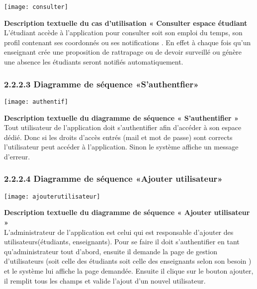 \documentclass[a4paper,12pt,oneside]{report}
\begin{document}
\begin{center}
\texttt{[image: consulter]}
\label{fig1}
\end{center}
\textbf{Description textuelle du cas d'utilisation « Consulter espace étudiant } \\
L'étudiant accède à l'application pour consulter soit son emploi du temps, son profil contenant ses coordonnés ou ses notifications . En effet à chaque fois qu'un enseignant crée une proposition de rattrapage ou de devoir surveillé ou génère une absence les étudiants seront notifiés  automatiquement.
\subsubsection{ 2.2.2.3 Diagramme de séquence «S’authentfier»}
\begin{center}
\texttt{[image: authentif]}
\label{fig1}
\end{center}
\textbf{Description textuelle du diagramme de séquence « S’authentifier »}\\
Tout utilisateur de l'application doit s'authentifier afin d'accéder à son espace dédié. Donc si les droits d'accès entrés (mail et mot de passe) sont corrects l'utilisateur peut accéder à l'application. Sinon le système affiche un message d'erreur. 
\subsubsection{ 2.2.2.4 Diagramme de séquence «Ajouter utilisateur»}
\begin{center}
\texttt{[image: ajouterutilisateur]}
\label{fig1}
\end{center}
\textbf{Description textuelle du diagramme de séquence « Ajouter utilisateur »}\\
L'administrateur de l'application est celui qui est responsable d'ajouter des utilisateurs(étudiants, enseignants). Pour se faire il doit s'authentifier en tant qu'administrateur tout d'abord, ensuite il demande la page de gestion d'utilisateurs (soit celle des étudiants soit celle des enseignants selon son besoin ) et le système lui affiche la page  demandée. Ensuite il clique sur le bouton ajouter, il remplit tous les champs et valide l'ajout d'un nouvel utilisateur.
\end{document}
